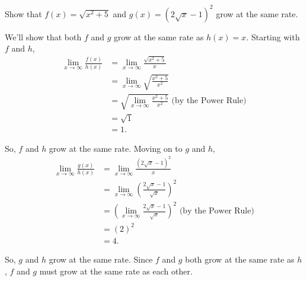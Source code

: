 \begin{example}
	Show that $f(x)=\sqrt{x^2+5}$ and $g(x)=\left(2\sqrt{x}-1\right)^2$ grow at the same rate.
\end{example}
\begin{answer}
	We'll show that both $f$ and $g$ grow at the same rate as $h(x)=x$.
	Starting with $f$ and $h$,
	\begin{align*}
		\lim_{x\to\infty}{\frac{f(x)}{h(x)}} &= \lim_{x\to\infty}{\frac{\sqrt{x^2+5}}{x}} \\
		&= \lim_{x\to\infty}{\sqrt{\frac{x^2+5}{x^2}}} \\
		&= \sqrt{\lim_{x\to\infty}{\frac{x^2+5}{x^2}}} \text{ (by the Power Rule)} \\
		&= \sqrt{1} \\
		&= 1.
	\end{align*}
	
	So, $f$ and $h$ grow at the same rate.
	Moving on to $g$ and $h$,
	\begin{align*}
		\lim_{x\to\infty}{\frac{g(x)}{h(x)}} &= \lim_{x\to\infty}{\frac{\left(2\sqrt{x}-1\right)^2}{x}} \\
		&= \lim_{x\to\infty}{\left(\frac{2\sqrt{x}-1}{\sqrt{x}}\right)^2} \\
		&= \left(\lim_{x\to\infty}{\frac{2\sqrt{x}-1}{\sqrt{x}}}\right)^2 \text{ (by the Power Rule)} \\
		&= \left(2\right)^2 \\
		&= 4.
	\end{align*}
	
	So, $g$ and $h$ grow at the same rate.
	Since $f$ and $g$ both grow at the same rate as $h$, $f$ and $g$ must grow at the same rate as each other.
\end{answer}

